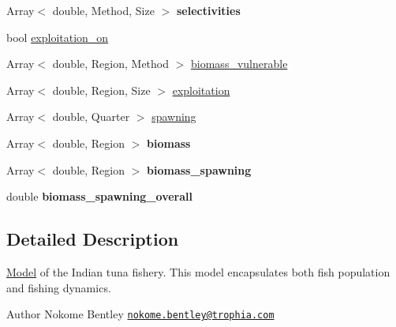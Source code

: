 \begin{DoxyCompactItemize}
\item 
\hypertarget{classIOSKJ_1_1Model_aa59ec2970e6ab5478b29d68ad89b67d9}{Array$<$ double, Method, Size $>$ {\bfseries selectivities}}\label{classIOSKJ_1_1Model_aa59ec2970e6ab5478b29d68ad89b67d9}

\item 
bool \hyperlink{classIOSKJ_1_1Model_ab9afc5bae0ac8e16817802e54bdfa60d}{exploitation\-\_\-on}
\item 
Array$<$ double, Region, Method $>$ \hyperlink{classIOSKJ_1_1Model_a0aa015def5316af0f5ce23bdaecbf67c}{biomass\-\_\-vulnerable}
\item 
Array$<$ double, Region, Size $>$ \hyperlink{classIOSKJ_1_1Model_ad4379e82be5723f2e1b58e9492dde3dc}{exploitation}
\item 
Array$<$ double, Quarter $>$ \hyperlink{classIOSKJ_1_1Model_a81bffc6707aa313f87bf21dbbf1d8143}{spawning}
\item 
\hypertarget{classIOSKJ_1_1Model_a05da71e81b1a0a7ecbba4d417f4ba727}{Array$<$ double, Region $>$ {\bfseries biomass}}\label{classIOSKJ_1_1Model_a05da71e81b1a0a7ecbba4d417f4ba727}

\item 
\hypertarget{classIOSKJ_1_1Model_ac507a33d868bbf1b74a6e098f32eb49f}{Array$<$ double, Region $>$ {\bfseries biomass\-\_\-spawning}}\label{classIOSKJ_1_1Model_ac507a33d868bbf1b74a6e098f32eb49f}

\item 
\hypertarget{classIOSKJ_1_1Model_a98d798c4e85e38a52c0b901ac19b82b1}{double {\bfseries biomass\-\_\-spawning\-\_\-overall}}\label{classIOSKJ_1_1Model_a98d798c4e85e38a52c0b901ac19b82b1}

\end{DoxyCompactItemize}


\subsection{Detailed Description}
\hyperlink{classIOSKJ_1_1Model}{Model} of the Indian tuna fishery. This model encapsulates both fish population and fishing dynamics.

\begin{DoxyAuthor}{Author}
Nokome Bentley \href{mailto:nokome.bentley@trophia.com}{\tt nokome.\-bentley@trophia.\-com} 
\end{DoxyAuthor}


